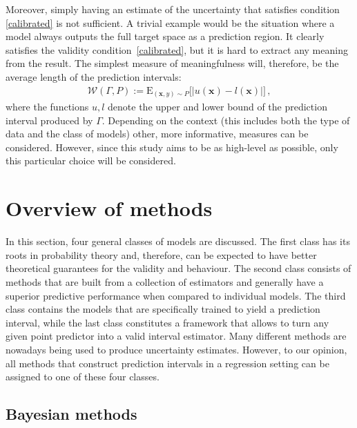 \documentclass[smallcondensed]{svjour3}
\begin{document}
    Moreover, simply having an estimate of the uncertainty that satisfies condition \eqref{calibrated} is not sufficient. A trivial example would be the situation where a model always outputs the full target space as a prediction region. It clearly satisfies the validity condition~\eqref{calibrated}, but it is hard to extract any meaning from the result. The simplest measure of meaningfulness will, therefore, be the average length of the prediction intervals:
    \begin{gather}
        \label{expected_width}
        \mathcal{W}(\Gamma,P) := \mathrm{E}_{(\mathbf{x},y) \sim P}\big[|u(\mathbf{x}) - l(\mathbf{x})|\big]\,,
    \end{gather}
    where the functions $u,l$ denote the upper and lower bound of the prediction interval produced by $\Gamma$. Depending on the context (this includes both the type of data and the class of models) other, more informative, measures can be considered. However, since this study aims to be as high-level as possible, only this particular choice will be considered.

\section{Overview of methods}\label{section:methods}

    In this section, four general classes of models are discussed. The first class has its roots in probability theory and, therefore, can be expected to have better theoretical guarantees for the validity and behaviour. The second class consists of methods that are built from a collection of estimators and generally have a superior predictive performance when compared to individual models. The third class contains the models that are specifically trained to yield a prediction interval, while the last class constitutes a framework that allows to turn any given point predictor into a valid interval estimator. Many different methods are nowadays being used to produce uncertainty estimates. However, to our opinion, all methods that construct prediction intervals in a regression setting can be assigned to one of these four classes.

\subsection{Bayesian methods}\label{section:exact}
\end{document}
